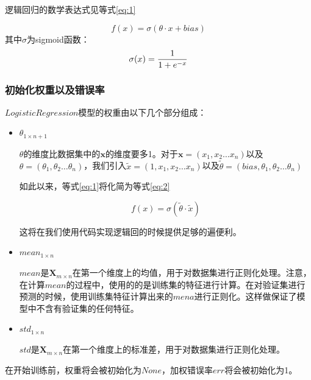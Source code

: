 \documentclass{paper}
\begin{document}
逻辑回归的数学表达式见等式\ref{eq:1}


\begin{equation} \label{eq:1}
    f(x) = \sigma(\theta \cdot x + bias)
\end{equation}
其中$\sigma$为sigmoid函数：
\begin{equation} \label{eq:1}
    \sigma(x) = {1 \over {1 + e^{-x}}}
\end{equation}

\subsubsection{初始化权重以及错误率}

$LogisticRegression$模型的权重由以下几个部分组成：

\begin{itemize}
    \item $\theta_{1 \times n+1}$
    
            $\theta$的维度比数据集中的$\mathbf{x}$的维度要多1。对于$\mathbf{x} = (x_1, x_2 \dots x_n)$以及$\theta = (\theta_1, \theta_2 \dots \theta_n)$，我们引入$\tilde{x} = (1, x_1, x_2 \dots x_n)$以及$\tilde{\theta} = (bias, \theta_1, \theta_2 \dots \theta_n)$

            如此以来，等式\ref{eq:1}将化简为等式\ref{eq:2}

            \begin{equation}
                \label{eq:2}
                f(x) = \sigma(\tilde{\theta} \cdot \tilde{x})
            \end{equation}

            这将在我们使用代码实现逻辑回的时候提供足够的遍便利。
    
    \item $mean_{1 \times n}$

            $mean$是$\mathbf{X}_{m \times n}$在第一个维度上的均值，用于对数据集进行正则化处理。注意，在计算$mean$的过程中，使用的的是训练集的特征进行计算。在对验证集进行预测的时候，使用训练集特征计算出来的$mena$进行正则化。这样做保证了模型中不含有验证集的任何特征。

    \item $std_{1 \times n}$

            $std$是$\mathbf{X}_{m \times n}$在第一个维度上的标准差，用于对数据集进行正则化处理。
\end{itemize}

在开始训练前，权重将会被初始化为$None$，加权错误率$err$将会被初始化为1。
\end{document}
